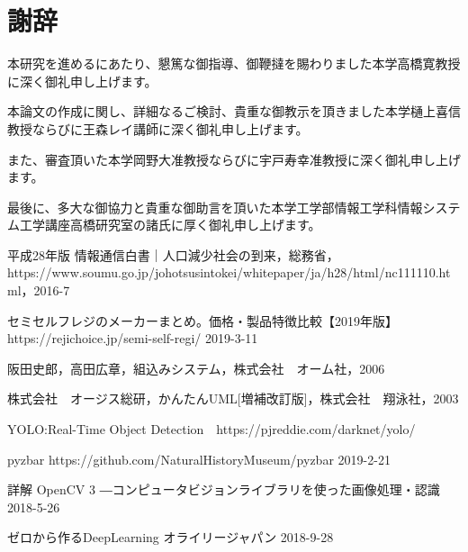 \chapter*{謝辞}
本研究を進めるにあたり、懇篤な御指導、御鞭撻を賜わりました本学高橋寛教授に深く御礼申し上げます。

本論文の作成に関し、詳細なるご検討、貴重な御教示を頂きました本学樋上喜信教授ならびに王森レイ講師に深く御礼申し上げます。

また、審査頂いた本学岡野大准教授ならびに宇戸寿幸准教授に深く御礼申し上げます。

最後に、多大な御協力と貴重な御助言を頂いた本学工学部情報工学科情報システム工学講座高橋研究室の諸氏に厚く御礼申し上げます。


\begin{thebibliography}{99}

平成28年版 情報通信白書｜人口減少社会の到来，総務省，https://www.soumu.go.jp/johotsusintokei/whitepaper/ja/h28/html/nc111110.html，2016-7


セミセルフレジのメーカーまとめ。価格・製品特徴比較【2019年版】 https://rejichoice.jp/semi-self-regi/
2019-3-11

阪田史郎，高田広章，組込みシステム，株式会社　オーム社，2006

株式会社　オージス総研，かんたんUML[増補改訂版]，株式会社　翔泳社，2003

YOLO:Real-Time Object Detection　https://pjreddie.com/darknet/yolo/

pyzbar https://github.com/NaturalHistoryMuseum/pyzbar 2019-2-21

詳解 OpenCV 3 ―コンピュータビジョンライブラリを使った画像処理・認識 2018-5-26

ゼロから作るDeepLearning オライリージャパン  2018-9-28


\end{thebibliography}


